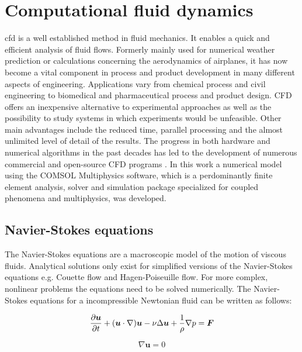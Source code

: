 \section{Computational fluid dynamics}
\label{sec:CFD}
\Gls{cfd} is a well established method in fluid mechanics. It enables a quick and efficient analysis of fluid flows. Formerly mainly used for numerical weather prediction or calculations concerning the aerodynamics of airplanes, it has now become a vital component in process and
product development in many different aspects of engineering. Applications vary from chemical process and civil engineering to biomedical and pharmaceutical
process and product design. CFD offers an inexpensive alternative to experimental approaches as well as the possibility to study systems in which experiments
would be unfeasible. Other main advantages include the reduced time, parallel processing and the almost unlimited level of detail of the results. The progress in both hardware and numerical algorithms in the past decades has led to the development of numerous commercial and open-source CFD programs \cite{ghia1982high}. In this work a numerical model using the COMSOL Multiphysics software, which is a perdominantly finite element analysis, solver and simulation package specialized for coupled phenomena and multiphysics, was developed.

\subsection{Navier-Stokes equations}
\label{subsec:Navier_Stokes}
The Navier-Stokes equations are a macroscopic model of the motion of viscous fluids. Analytical solutions only exist for simplified versions of the Navier-Stokes equations e.g. Couette flow and Hagen-Poiseuille flow. For more complex, nonlinear problems the equations need to be solved numerically. The Navier-Stokes equations for a incompressible Newtonian fluid can be written as follows: 

\begin{equation}
{\partial{\boldsymbol u}\over{\partial t}} + ({\boldsymbol u} \cdot \nabla) {\boldsymbol u} - \nu\Delta{\boldsymbol u}+ \frac{1}{\rho}\nabla p = {\boldsymbol F}
\label{eq:Concervation of momentum }
\end{equation}

\begin{equation}
\nabla{\boldsymbol u} = 0
\label{eq:Conservation of mass }
\end{equation}

